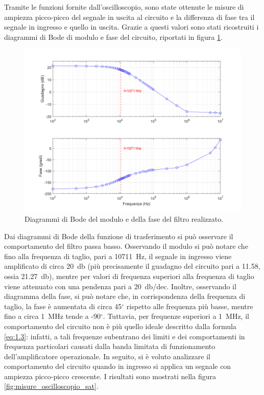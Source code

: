 \noindent
Tramite le funzioni fornite dall'oscilloscopio, sono state ottenute le misure di ampiezza picco-picco del segnale in uscita al circuito e la differenza di fase tra il segnale in ingresso e quello in uscita. Grazie a questi valori sono stati ricostruiti i diagrammi di Bode di modulo e fase del circuito, riportati in figura \ref{fig:diagrammi_di_Bode}.
\begin{figure}[h!]
	\centering
	\includegraphics[width=0.80\linewidth]{./ImageFiles/Laboratorio 1/Diagrammi di Bode.png}
	\caption{Diagrammi di Bode del modulo e della fase del filtro realizzato.}
	\label{fig:diagrammi_di_Bode}
\end{figure}
Dai diagrammi di Bode della funzione di trasferimento si può osservare il comportamento del filtro passa basso. Osservando il modulo si può notare che fino alla frequenza di taglio, pari a \SI{10711}{\hertz}, il segnale in ingresso viene amplificato di circa \SI{20}{\decibel} (più precisamente il guadagno del circuito pari a 11.58, ossia \SI{21.27}{\decibel}), mentre per valori di frequenza superiori alla frequenza di taglio viene attenuato con una pendenza pari a \SI{20}{\decibel}/dec. Inoltre, osservando il diagramma della fase, si può notare che, in corrispondenza della frequenza di taglio, la fase è aumentata di circa 45$^{\circ}$ rispetto alle frequenza più basse, mentre fino a circa \SI{1}{\mega\hertz} tende a -90$^{\circ}$.
Tuttavia, per frequenze superiori a \SI{1}{\mega\hertz}, il comportamento del circuito non è più quello ideale descritto dalla formula \ref{eq:1.3}: infatti, a tali frequenze subentrano dei limiti e dei comportamenti in frequenza particolari causati dalla banda limitata di funzionamento dell'amplificatore operazionale.
\clearpage
In seguito, si è voluto analizzare il comportamento del circuito quando in ingresso si applica un segnale con ampiezza picco-picco crescente. I risultati sono mostrati nella figura \ref{fig:misure_oscilloscopio_sat}.
